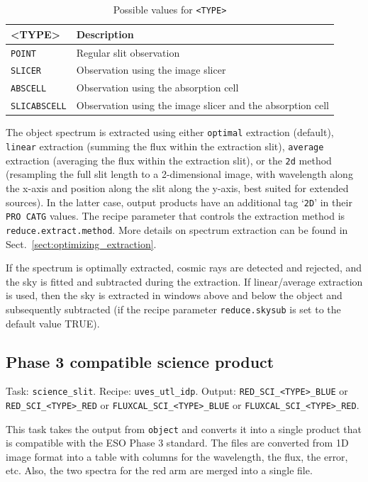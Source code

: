 \begin{table}[htbp]
\centering
\begin{tabular}{|l|l|}
\hline
\textbf{<TYPE>} & \textbf{Description} \\
\hline 
{\tt POINT}               &Regular slit observation\\
{\tt SLICER}              &Observation using the image slicer\\
{\tt ABSCELL}             &Observation using the absorption cell\\
{\tt SLICABSCELL}         &Observation using the image slicer and the absorption cell\\
\hline
\end{tabular}
\caption{Possible values for {\tt <TYPE>}}
\label{tab:object-types}
\end{table}

The object spectrum is extracted using either {\tt optimal} extraction (default), 
{\tt linear} extraction (summing the flux within the extraction slit), 
{\tt average} extraction (averaging the flux within the extraction slit),
or the {\tt 2d} method (resampling the full slit length to a 2-dimensional image,
with wavelength along the x-axis and position along the slit along the y-axis, 
best suited for extended sources). In the latter case, output products have an additional tag
`{\tt 2D}' in their {\tt PRO CATG} values. The recipe parameter that controls the extraction
method is {\tt reduce.extract.method}.
More details on spectrum extraction can be found in Sect.~\ref{sect:optimizing_extraction}.

If the spectrum is optimally extracted, cosmic rays are detected and rejected, 
and the sky is fitted and subtracted during the extraction. 
If linear/average extraction is used, then the sky is extracted in windows above and below
the object and subsequently subtracted 
(if the recipe parameter {\tt reduce.skysub} is set to the default value TRUE).

\subsection{Phase 3 compatible science product}

Task: {\tt science\_slit}. Recipe: {\tt uves\_utl\_idp}. \newline
Output: {\tt RED\_SCI\_<TYPE>\_BLUE} or {\tt RED\_SCI\_<TYPE>\_RED} or 
{\tt FLUXCAL\_SCI\_<TYPE>\_BLUE} or {\tt FLUXCAL\_SCI\_<TYPE>\_RED}.

This task takes the output from {\tt object} and converts it into a single product that is
compatible with the ESO Phase 3 standard. The files are converted from
1D image format into a table with columns for the wavelength, the flux, the error, etc. Also,
the two spectra for the red arm are merged into a single file.

